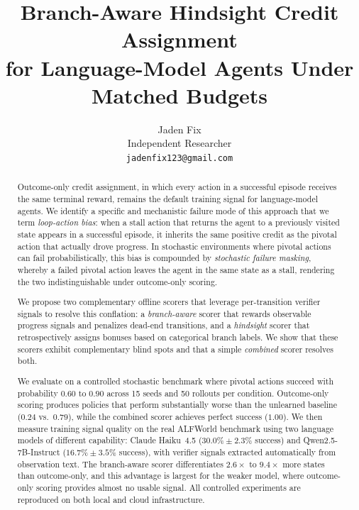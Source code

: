 \documentclass[11pt]{article}
\title{\textbf{Branch-Aware Hindsight Credit Assignment\\for Language-Model Agents Under Matched Budgets}}
\author{
  Jaden Fix \\
  Independent Researcher \\
  \texttt{jadenfix123@gmail.com}
}
\date{}
\begin{document}
\maketitle

\begin{abstract}
Outcome-only credit assignment, in which every action in a successful episode receives the same terminal reward, remains the default training signal for language-model agents. We identify a specific and mechanistic failure mode of this approach that we term \emph{loop-action bias}: when a stall action that returns the agent to a previously visited state appears in a successful episode, it inherits the same positive credit as the pivotal action that actually drove progress. In stochastic environments where pivotal actions can fail probabilistically, this bias is compounded by \emph{stochastic failure masking}, whereby a failed pivotal action leaves the agent in the same state as a stall, rendering the two indistinguishable under outcome-only scoring.

We propose two complementary offline scorers that leverage per-transition verifier signals to resolve this conflation: a \emph{branch-aware} scorer that rewards observable progress signals and penalizes dead-end transitions, and a \emph{hindsight} scorer that retrospectively assigns bonuses based on categorical branch labels. We show that these scorers exhibit complementary blind spots and that a simple \emph{combined} scorer resolves both.

We evaluate on a controlled stochastic benchmark where pivotal actions succeed with probability $0.60$ to $0.90$ across 15 seeds and 50 rollouts per condition. Outcome-only scoring produces policies that perform substantially worse than the unlearned baseline ($0.24$ vs.\ $0.79$), while the combined scorer achieves perfect success ($1.00$). We then measure training signal quality on the real ALFWorld benchmark \citep{shridhar2021alfworld} using two language models of different capability: Claude Haiku~4.5 ($30.0\% \pm 2.3\%$ success) and Qwen2.5-7B-Instruct ($16.7\% \pm 3.5\%$ success), with verifier signals extracted automatically from observation text. The branch-aware scorer differentiates $2.6\times$ to $9.4\times$ more states than outcome-only, and this advantage is largest for the weaker model, where outcome-only scoring provides almost no usable signal. All controlled experiments are reproduced on both local and cloud infrastructure.
\end{abstract}
\end{document}
